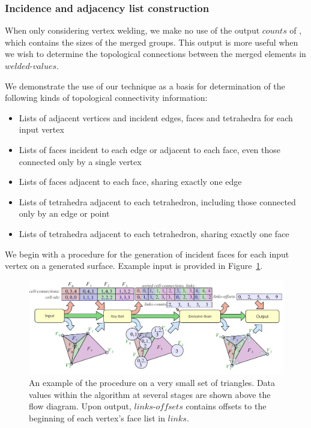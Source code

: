 \documentclass[review,journal]{vgtc}         %
\begin{document}
\subsubsection{Incidence and adjacency list construction}
\label{sec:topology}
When only considering vertex welding, we make no use of the output $counts$ of , which contains the sizes of the merged groups. This output is more useful when we wish to determine the topological connections between the merged elements in $welded\mbox{-}values$. 

\noindent
\begin{minipage}{\linewidth}
We demonstrate the use of our  technique as a basis for determination of the following kinds of topological connectivity information:

\begin{itemize}
\item{Lists of adjacent vertices and incident edges, faces and tetrahedra for each input vertex}
\item{Lists of faces incident to each edge or adjacent to each face, even those connected only by a single vertex}
\item{Lists of faces adjacent to each face, sharing exactly one edge}
\item{Lists of tetrahedra adjacent to each tetrahedron, including those connected only by an edge or point}
\item{Lists of tetrahedra adjacent to each tetrahedron, sharing exactly one face}
\end{itemize}
\vspace{0.2cm}
\end{minipage}

We begin with a procedure  for the generation of incident faces for each input vertex on a generated surface. Example input is provided in Figure~\ref{fig:IncidenceList}.
\begin{figure}[!tb]
\includegraphics[width=\textwidth]{IncidenceList.pdf}
\caption{An example of the  procedure on a very small set of triangles. Data values within the algorithm at several stages are shown above the flow diagram. Upon output, $links\mbox{-}offsets$ contains offsets to the beginning of each vertex's face list in $links$.}
\label{fig:IncidenceList}
\end{figure}
\end{document}
